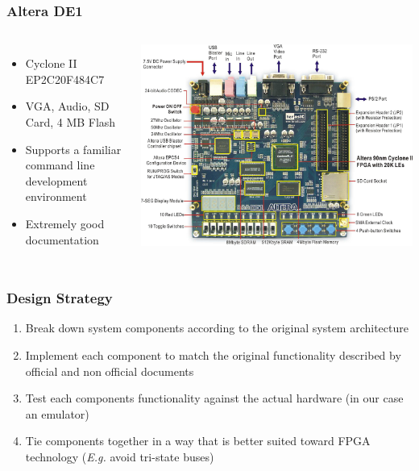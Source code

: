 \documentclass{beamer}
\newlength{\wideitemsep}
\let\olditem\item
\renewcommand{\item}{\setlength{\itemsep}{\wideitemsep}\olditem}
\begin{document}
\begin{frame}
    \frametitle{Altera DE1}

    \begin{columns}[c]
            \begin{itemize}
                \item Cyclone II EP2C20F484C7
                \item VGA, Audio, SD Card, 4 MB Flash
                \item Supports a familiar command line development environment
                \item Extremely good documentation
            \end{itemize}

            \includegraphics[width=\textwidth]{de1.jpg}
    \end{columns}
\end{frame}

\begin{frame}
    \frametitle{Design Strategy}
    \begin{enumerate}
        \item<1-> Break down system components according to the original system architecture
        \item<2-> Implement each component to match the original functionality described by official and
            non official documents
        \item<3-> Test each components functionality against the actual hardware (in our case an emulator)
        \item<4-> Tie components together in a way that is better suited toward FPGA technology (\emph{E.g.} avoid tri-state buses)
    \end{enumerate}
\end{frame}
\end{document}
